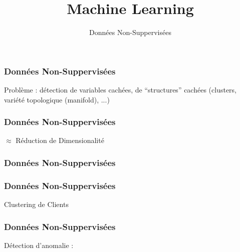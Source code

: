 \documentclass{formation}
\title{Machine Learning}
\subtitle{Données Non-Suppervisées}
\begin{document}
\maketitle

\begin{frame}
  \frametitle{Données Non-Suppervisées}
  Problème : détection de variables cachées, de ``structures'' cachées (clusters, variété topologique (manifold), ...) \\ $\;$ \\
  \begin{minipage}[l]{0.69\linewidth}
  \end{minipage}\hfill
  \begin{minipage}[l]{0.29\linewidth}
  \end{minipage}\hfill
\end{frame}

\begin{frame}
  \frametitle{Données Non-Suppervisées}
  \begin{center}
    $\approx$ Réduction de Dimensionalité
  \end{center}
\end{frame}

\begin{frame}
  \frametitle{Données Non-Suppervisées}
  \begin{minipage}[l]{0.69\linewidth}
  \end{minipage}\hfill
  \begin{minipage}[l]{0.29\linewidth}
  \end{minipage}\hfill
\end{frame}

\begin{frame}
  \frametitle{Données Non-Suppervisées}
  Clustering de Clients
\end{frame}

\begin{frame}
  \frametitle{Données Non-Suppervisées}
  Détection d'anomalie :
\end{frame}
\end{document}
